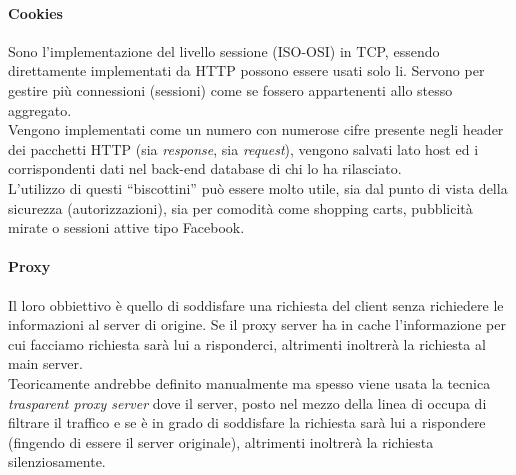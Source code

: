 \documentclass[12pt]{article}
\begin{document}
\paragraph{Cookies} Sono l'implementazione del livello sessione (ISO-OSI) in TCP, essendo direttamente implementati da HTTP possono essere usati solo li. Servono per gestire più connessioni (sessioni) come se fossero appartenenti allo stesso aggregato.\\
Vengono implementati come un numero con numerose cifre presente negli header dei pacchetti HTTP (sia \textit{response}, sia \textit{request}), vengono salvati lato host ed i corrispondenti dati nel back-end database di chi lo ha rilasciato.\\
L'utilizzo di questi ``biscottini'' può essere molto utile, sia dal punto di vista della sicurezza (autorizzazioni), sia per comodità come shopping carts, pubblicità mirate o sessioni attive tipo Facebook.

\paragraph{Proxy} Il loro obbiettivo è quello di soddisfare una richiesta del client senza richiedere le informazioni al server di origine. Se il proxy server ha in cache l'informazione per cui facciamo richiesta sarà lui a risponderci, altrimenti inoltrerà la richiesta al main server.\\
Teoricamente andrebbe definito manualmente ma spesso viene usata la tecnica \textit{trasparent proxy server} dove il server, posto nel mezzo della linea di occupa di filtrare il traffico e se è in grado di soddisfare la richiesta sarà lui a rispondere (fingendo di essere il server originale), altrimenti inoltrerà la richiesta silenziosamente.
\end{document}
